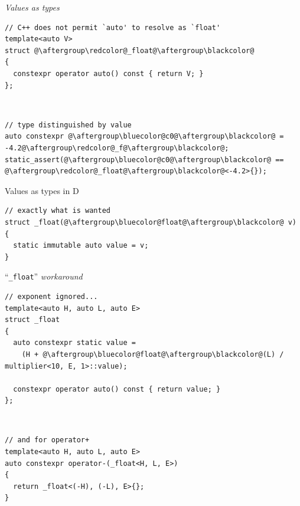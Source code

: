 \documentclass[xcolor=dvipsnames]{beamer}
\newcommand\dangersign[1][2ex]{%
  \renewcommand\stacktype{L}%
  \scaleto{\stackon[1.3pt]{\color{red}$\triangle$}{\tiny\bfseries !}}{#1}%
}
\begin{document}
\begin{frame}[fragile]{\dangersign \emph{Values as types} \dangersign}
\begin{lstlisting}
// C++ does not permit `auto' to resolve as `float'
template<auto V>
struct @\aftergroup\redcolor@_float@\aftergroup\blackcolor@
{
  constexpr operator auto() const { return V; }
};
\end{lstlisting}

~

\begin{lstlisting}
// type distinguished by value
auto constexpr @\aftergroup\bluecolor@c0@\aftergroup\blackcolor@ = -4.2@\aftergroup\redcolor@_f@\aftergroup\blackcolor@;
static_assert(@\aftergroup\bluecolor@c0@\aftergroup\blackcolor@ == @\aftergroup\redcolor@_float@\aftergroup\blackcolor@<-4.2>{});
\end{lstlisting}
\end{frame}


\begin{frame}[fragile]{Values as types in D}
\begin{lstlisting}
// exactly what is wanted
struct _float(@\aftergroup\bluecolor@float@\aftergroup\blackcolor@ v)
{
  static immutable auto value = v;
}
\end{lstlisting}
\end{frame}


\begin{frame}[fragile]{``\texttt{\_float}'' \emph{workaround}}
\begin{lstlisting}
// exponent ignored...
template<auto H, auto L, auto E>
struct _float
{
  auto constexpr static value =
    (H + @\aftergroup\bluecolor@float@\aftergroup\blackcolor@(L) / multiplier<10, E, 1>::value);

  constexpr operator auto() const { return value; }
};
\end{lstlisting}

~

\begin{lstlisting}
// and for operator+
template<auto H, auto L, auto E>
auto constexpr operator-(_float<H, L, E>)
{
  return _float<(-H), (-L), E>{};
}
\end{lstlisting}
\end{frame}
\end{document}
